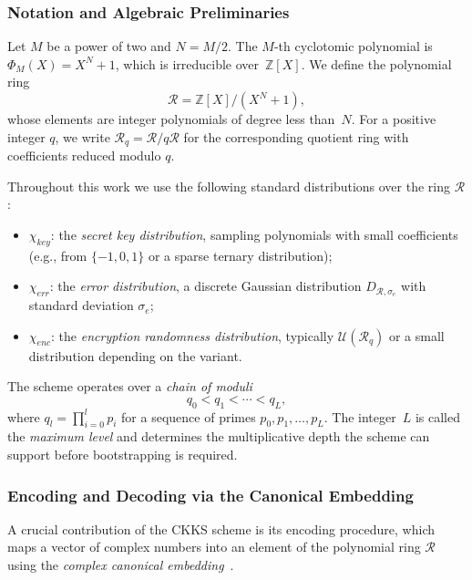 \subsubsection{Notation and Algebraic Preliminaries}

Let $M$ be a power of two and $N = M/2$. The $M$-th cyclotomic polynomial is $\Phi_M(X) = X^N + 1$, which is irreducible over~$\mathbb{Z}[X]$. We define the polynomial ring
\begin{equation}
    \mathcal{R} = \mathbb{Z}[X]/(X^N + 1),
\end{equation}
whose elements are integer polynomials of degree less than~$N$. For a positive integer $q$, we write $\mathcal{R}_q = \mathcal{R}/q\mathcal{R}$ for the corresponding quotient ring with coefficients reduced modulo $q$.

Throughout this work we use the following standard distributions over the ring $\mathcal{R}$:
\begin{itemize}
    \item $\chi_{\mathit{key}}$: the \emph{secret key distribution}, sampling polynomials with small coefficients (e.g., from $\{-1, 0, 1\}$ or a sparse ternary distribution);
    \item $\chi_{\mathit{err}}$: the \emph{error distribution}, a discrete Gaussian distribution $D_{\mathcal{R}, \sigma_e}$ with standard deviation $\sigma_e$;
    \item $\chi_{\mathit{enc}}$: the \emph{encryption randomness distribution}, typically $\mathcal{U}(\mathcal{R}_q)$ or a small distribution depending on the variant.
\end{itemize}

The scheme operates over a \emph{chain of moduli}
\begin{equation}
    q_0 < q_1 < \cdots < q_L,
\end{equation}
where $q_l = \prod_{i=0}^{l} p_i$ for a sequence of primes $p_0, p_1, \ldots, p_L$. The integer~$L$ is called the \emph{maximum level} and determines the multiplicative depth the scheme can support before bootstrapping is required.

\subsubsection{Encoding and Decoding via the Canonical Embedding}

A crucial contribution of the CKKS scheme is its encoding procedure, which maps a vector of complex numbers into an element of the polynomial ring $\mathcal{R}$ using the \emph{complex canonical embedding}~\cite{cheon2017homomorphic}.

